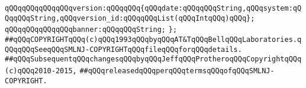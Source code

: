 \newline
\newline
\newline
\verb|qQQqqQQqqQQqqQQqversion:qQQqqQQq{qQQqdate:qQQqqQQqString,qQQqsystem:qQQqqQQqString,qQQqversion_id:qQQqqQQqList(qQQqIntqQQq)qQQq};|\newline
\verb|qQQqqQQqqQQqqQQqbanner:qQQqqQQqString;|\newline
\newline
\verb|};|\newline
\newline
\newline
\newline
\verb|##qQQqCOPYRIGHTqQQq(c)qQQq1993qQQqbyqQQqAT&TqQQqBellqQQqLaboratories.qQQqqQQqSeeqQQqSMLNJ-COPYRIGHTqQQqfileqQQqforqQQqdetails.|\newline
\verb|##qQQqSubsequentqQQqchangesqQQqbyqQQqJeffqQQqProtheroqQQqCopyrightqQQq(c)qQQq2010-2015,|\newline
\verb|##qQQqreleasedqQQqperqQQqtermsqQQqofqQQqSMLNJ-COPYRIGHT.|\newline


